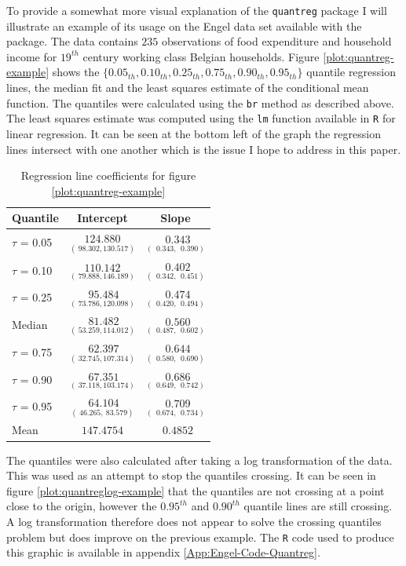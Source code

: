 \documentclass[12pt,a4paper]{report}
\begin{document}
To provide a somewhat more visual explanation of the {\small\verb"quantreg"} package I will illustrate an example of its usage on the Engel data set available with the package. The data contains $235$ observations of food expenditure and household income for $19^{th}$ century working class Belgian households. Figure \ref{plot:quantreg-example} shows the $\{0.05_{th},0.10_{th},0.25_{th},0.75_{th},0.90_{th},0.95_{th}\}$ quantile regression lines, the median fit and the least squares estimate of the conditional mean function. The quantiles were calculated using the {\small\verb"br"} method as described above. The least squares estimate was computed using the {\small\verb"lm"} function available in {\small\verb"R"} for linear regression. It can be seen at the bottom left of the graph the regression lines intersect with one another which is the issue I hope to address in this paper.
\vspace{2mm}

\begin{table}[ht]
\begin{center}
\begin{tabular}{|l||c|c|} \hline
\multicolumn{1}{|l||}{Quantile}&\multicolumn{1}{c|}{Intercept}&\multicolumn{1}{c|}{Slope}\tabularnewline
\hline
$\tau$ = 0.05&$\underset{(~98.302,130.517)}{124.880}$&$\underset{(~~0.343,~~0.390)}{~~0.343}$\tabularnewline
$\tau$ = 0.10&$\underset{(~79.888,146.189)}{110.142}$&$\underset{(~~0.342,~~0.451)}{~~0.402}$\tabularnewline
$\tau$ = 0.25&$\underset{(~73.786,120.098)}{~95.484}$&$\underset{(~~0.420,~~0.494)}{~~0.474}$\tabularnewline
Median&$\underset{(~53.259,114.012)}{~81.482}$&$\underset{(~~0.487,~~0.602)}{~~0.560}$\tabularnewline
$\tau$ = 0.75&$\underset{(~32.745,107.314)}{~62.397}$&$\underset{(~~0.580,~~0.690)}{~~0.644}$\tabularnewline
$\tau$ = 0.90&$\underset{(~37.118,103.174)}{~67.351}$&$\underset{(~~0.649,~~0.742)}{~~0.686}$\tabularnewline
$\tau$ = 0.95&$\underset{(~46.265,~83.579)}{~64.104}$&$\underset{(~~0.674,~~0.734)}{~~0.709}$\tabularnewline
Mean&$147.4754$&$~~0.4852$\tabularnewline
\hline
\end{tabular}
\end{center}
\caption{Regression line coefficients for figure \ref{plot:quantreg-example}}
\label{table:quantreg-example}
\end{table}

The quantiles were also calculated after taking a log transformation of the data. This was used as an attempt to stop the quantiles crossing. It can be seen in figure \ref{plot:quantreglog-example} that the quantiles are not crossing at a point close to the origin, however the $0.95^{th}$ and $0.90^{th}$ quantile lines are still crossing. A log transformation therefore does not appear to solve the crossing quantiles problem but does improve on the previous example. The {\small\verb"R"} code used to produce this graphic is available in appendix \ref{App:Engel-Code-Quantreg}.
\end{document}

